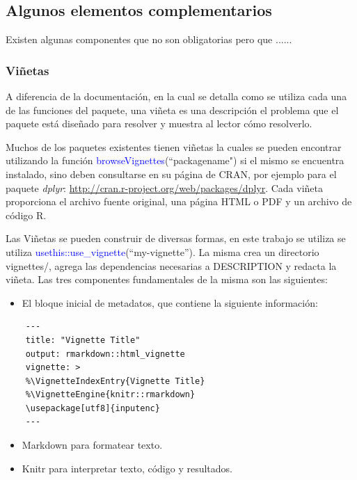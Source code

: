 \subsection{Algunos elementos complementarios}

Existen algunas componentes que no son obligatorias pero que ...... 

\subsubsection{Viñetas}

A diferencia de la documentación, en la cual se detalla como se utiliza cada una de las funciones del paquete, una viñeta es una descripción el problema que el paquete está diseñado para resolver y muestra al lector cómo resolverlo.

Muchos de los paquetes existentes tienen viñetas la cuales se pueden encontrar utilizando la función \textcolor{blue}{browseVignettes}(``packagename") si el mismo se encuentra instalado, sino deben consultarse en su página de CRAN, por ejemplo para el paquete \emph{dplyr}: \url{http://cran.r-project.org/web/packages/dplyr}. Cada viñeta proporciona el archivo fuente original, una página HTML o PDF y un archivo de código R. 

Las Viñetas se pueden construir de diversas formas, en este trabajo se utiliza se utiliza \textcolor{blue}{usethis::use\_vignette}(``my-vignette''). La misma crea un directorio vignettes/, agrega las dependencias necesarias a DESCRIPTION y redacta la viñeta. Las tres componentes fundamentales de la misma son las siguientes:

\begin{itemize}
	\item El bloque inicial de metadatos, que contiene la siguiente información:
\end{itemize}

\begin{verbatim}
	---
	title: "Vignette Title"
	output: rmarkdown::html_vignette
	vignette: >
	%\VignetteIndexEntry{Vignette Title}
	%\VignetteEngine{knitr::rmarkdown}
	\usepackage[utf8]{inputenc}
	---
\end{verbatim}

\begin{itemize}
	\item Markdown para formatear texto.
	\item Knitr para interpretar texto, código y resultados.
\end{itemize}


